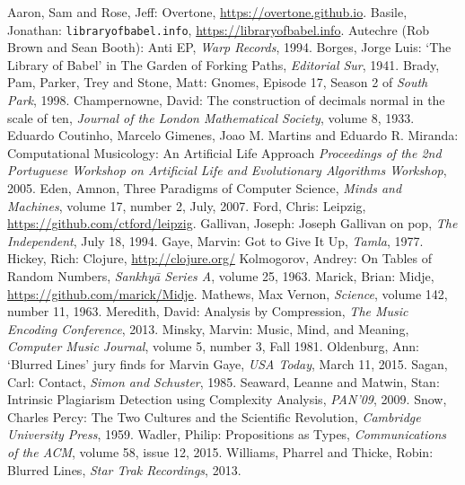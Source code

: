 \documentclass[numbers]{sigplanconf}
\begin{document}
\begin{thebibliography}{}
\softraggedright

 Aaron, Sam and Rose, Jeff: Overtone, \url{https://overtone.github.io}.
 Basile, Jonathan: \verb|libraryofbabel.info|, \url{https://libraryofbabel.info}.
 Autechre (Rob Brown and Sean Booth): Anti EP, \textit{Warp Records}, 1994.
 Borges, Jorge Luis: `The Library of Babel' in The Garden of Forking Paths, \textit{Editorial Sur}, 1941.
 Brady, Pam, Parker, Trey and Stone, Matt: Gnomes, Episode 17, Season 2 of \textit{South Park}, 1998.
 Champernowne, David: The construction of decimals normal in the scale of ten, \textit{Journal of the London Mathematical Society}, volume 8, 1933.
 Eduardo Coutinho, Marcelo Gimenes, Joao M. Martins and Eduardo R. Miranda: Computational	Musicology:	An Artificial Life Approach \textit{Proceedings of the 2nd Portuguese Workshop on Artiﬁcial Life and Evolutionary Algorithms Workshop}, 2005.
 Eden, Amnon, Three Paradigms of Computer Science, \textit{Minds and Machines}, volume 17, number 2, July, 2007.
 Ford, Chris: Leipzig, \url{https://github.com/ctford/leipzig}.
 Gallivan, Joseph: Joseph Gallivan on pop, \textit{The Independent}, July 18, 1994.
 Gaye, Marvin: Got to Give It Up, \textit{Tamla}, 1977.
 Hickey, Rich: Clojure, \url{http://clojure.org/}
  Kolmogorov, Andrey: On Tables of Random Numbers, \textit{Sankhyā Series A}, volume 25, 1963.
 Marick, Brian: Midje, \url{https://github.com/marick/Midje}.
 Mathews, Max Vernon, \textit{Science}, volume 142, number 11, 1963.
 Meredith, David: Analysis by Compression, \textit{The Music Encoding Conference}, 2013.
 Minsky, Marvin: Music, Mind, and Meaning, \textit{Computer Music Journal}, volume 5, number 3, Fall 1981.
 Oldenburg, Ann: `Blurred Lines' jury finds for Marvin Gaye, \textit{USA Today}, March 11, 2015.
 Sagan, Carl: Contact, \textit{Simon and Schuster}, 1985.
 Seaward, Leanne and Matwin, Stan: Intrinsic Plagiarism Detection using Complexity Analysis, \textit{PAN'09}, 2009.
 Snow, Charles Percy: The Two Cultures and the Scientific Revolution, \textit{Cambridge University Press}, 1959.
 Wadler, Philip: Propositions as Types, \textit{Communications of the ACM}, volume 58, issue 12, 2015.
 Williams, Pharrel and Thicke, Robin: Blurred Lines, \textit{Star Trak Recordings}, 2013.

\end{thebibliography}
\end{document}
